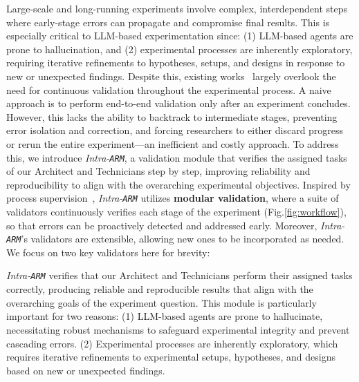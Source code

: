 Large-scale and long-running experiments involve complex, interdependent steps where early-stage errors can propagate and compromise final results. This is especially critical to LLM-based experimentation since: (1) LLM-based agents are prone to hallucination, and (2) experimental processes are inherently exploratory, requiring iterative refinements to hypotheses, setups, and designs in response to new or unexpected findings.
Despite this, existing works~\cite{lu2024ai, schmidgall2025agent} largely overlook the need for continuous validation throughout the experimental process. A naive approach is to perform end-to-end validation only after an experiment concludes. However, this lacks the ability to backtrack to intermediate stages, preventing error isolation and correction, and forcing researchers to either discard progress or rerun the entire experiment—an inefficient and costly approach.
To address this, we introduce \textit{Intra-\texttt{ARM}}, a validation module that verifies the assigned tasks of our Architect and Technicians step by step, improving reliability and reproducibility to align with the overarching experimental objectives.
Inspired by process supervision~\cite{lightman2023let}, 
\textit{Intra-\texttt{ARM}} utilizes
\textbf{modular validation}, where a suite of validators continuously verifies each stage of the experiment (Fig.\ref{fig:workflow}), so that errors can be proactively detected and addressed early.
Moreover, \textit{Intra-\texttt{ARM}}'s validators are extensible, allowing new ones to be incorporated as needed. We focus on two key validators here for brevity:

\textit{Intra-\texttt{ARM}} verifies that our Architect and Technicians perform their assigned tasks correctly, producing reliable and reproducible results that align with the overarching goals of the experiment question.
This module is particularly important for two reasons:
(1) LLM-based agents are prone to hallucinate, necessitating robust mechanisms to safeguard experimental integrity and prevent cascading errors.
(2) Experimental processes are inherently exploratory, which requires iterative refinements to experimental setups, hypotheses, and designs based on new or unexpected findings.

